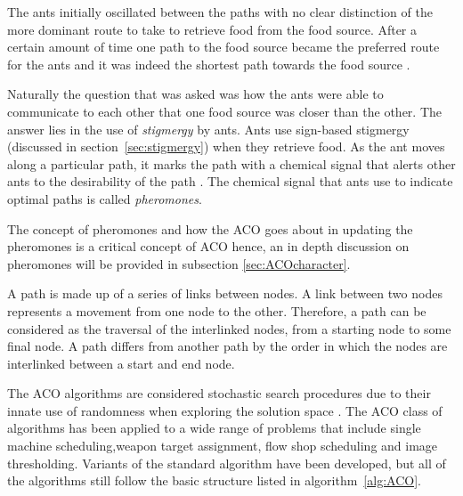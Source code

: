 The ants initially oscillated between the paths with no clear distinction of the more dominant route to take to retrieve food from the food source\cite{AntsAndStigmergy,CompuIntelligenceIntro}. After a certain amount of time one path to the food source became the preferred route for the ants and it was indeed the shortest path towards the food source \cite{AntsAndStigmergy}.

Naturally the question that was asked was how the ants were able to communicate to each other that one food source was closer than the other. The answer lies in the use of \emph{stigmergy} by ants\cite{AntsAndStigmergy,CompuIntelligenceIntro}. Ants use sign-based stigmergy (discussed in section~\ref{sec:stigmergy}) when they retrieve food\cite{AntIntroTrends,AntsAndStigmergy,CompuIntelligenceIntro}. As the ant moves along a particular path, it marks the path with a chemical signal that alerts other ants to the desirability of the path \cite{CompuIntelligenceIntro}. The chemical signal that ants use to indicate optimal paths is called \emph{pheromones}\cite{AntsAndStigmergy,CompuIntelligenceIntro}.

The concept of pheromones and how the ACO goes about in updating the pheromones is a critical concept of ACO hence, an in depth discussion on pheromones will be provided in subsection \ref{sec:ACOcharacter}.

A path is made up of a series of links between nodes\cite{AIModernApproach,DataStructuresJava}. A link between two nodes represents a movement from one node to the other\cite{AIModernApproach,DataStructuresJava}. Therefore, a path can be considered as the traversal of the interlinked nodes, from a starting node to some final node\cite{AIModernApproach,DataStructuresJava}. A path differs from another path by the order in which the nodes are interlinked between a start and end node\cite{AIModernApproach,DataStructuresJava}.

The ACO algorithms are considered stochastic search procedures due to their innate use of randomness when exploring the solution space \cite{ACOSurvey,ImpACOComplex}. The ACO class of algorithms has been applied to a wide range of problems that include single machine scheduling\cite{ACOSingleMachine},weapon target assignment\cite{WeaponTargetACO}, flow shop scheduling\cite{ACOFlowShop} and image thresholding\cite{ACOImageThreshold}. Variants of the standard algorithm have been developed, but all of the algorithms still follow the basic structure listed in algorithm~\ref{alg:ACO}\cite{CompuIntelligenceIntro,FundamentalSwarm}.

